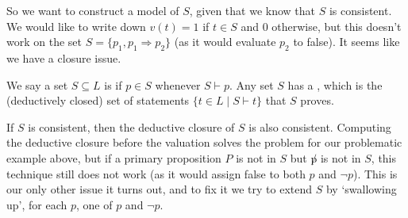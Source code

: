 \documentclass[a4paper]{scrartcl}
\begin{document}
So we want to construct a model of $S$, given that we know that $S$ is consistent. We would like to write down $v(t) = 1$ if $t \in S$ and $0$ otherwise, but this doesn't work on the set $S = \{p_1, p_1 \Rightarrow p_2 \}$ (as it would evaluate $p_2$ to false). It seems like we have a closure issue.

\begin{definition}
  We say a set $S \subseteq L$ is  if $p \in S$ whenever $S \vdash p$. Any set $S$ has a , which is the (deductively closed) set of statements $\{t \in L \mid S \vdash t\}$ that $S$ proves. 
\end{definition}

If $S$ is consistent, then the deductive closure of $S$ is also consistent. Computing the deductive closure before the valuation solves the problem for our problematic example above, but if a primary proposition $P$ is not in $S$ but $\not p$ is not in $S$, this technique still does not work (as it would assign false to both $p$ and $\lnot p$). This is our only other issue it turns out, and to fix it we try to extend $S$ by `swallowing up', for each $p$, one of $p$ and $\lnot p$.
\end{document}
